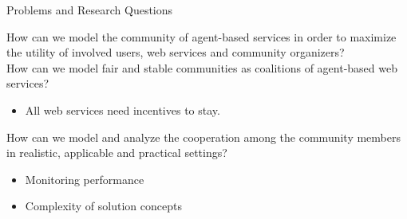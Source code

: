 \documentclass{beamer}
\begin{document}
\begin{frame}{Problems and Research Questions}


    \footnotesize{\colorbox{blue}{\color{white}{R1}} How can we model the community of agent-based services in order to maximize the utility
        of involved users, web services and community organizers?}\\
    \vspace{0.3cm} \colorbox{blue}{\color{white}{R2}} How can we model fair and stable communities as coalitions of agent-based web services?\\
        \begin{itemize}
            \item {\color{blue}All} web services need incentives to stay.
        \end{itemize}
    \vspace{0.3cm} \colorbox{blue}{\color{white}{R3}} How can we model and analyze the cooperation
        among the community members in realistic, applicable and practical settings?\\
        \begin{itemize}
            \item Monitoring performance
            \item Complexity of solution concepts
        \end{itemize}
\end{frame}
\end{document}
